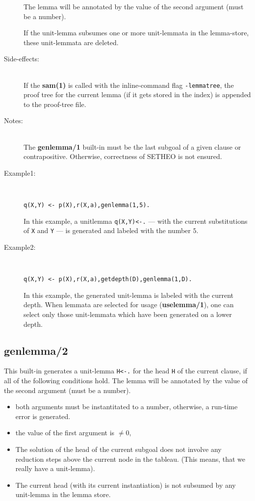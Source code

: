 \begin{description}
The lemma will be annotated by the value of the second argument
(must be a number).

If the unit-lemma subsumes one or more unit-lemmata in the lemma-store,
these unit-lemmata are deleted.

\item[Side-effects:]\ \\
If the {\bf sam(1)} is called with the inline-command flag {\tt -lemmatree},
the proof tree for the current lemma (if it gets stored in the index)
is appended to the proof-tree file.

\item[Notes:]\ \\
The {\bf genlemma/1} built-in must be the last subgoal of a given
clause or contrapositive.
Otherwise, correctness of SETHEO is not ensured.

\item[Example1:]\ \\
\begin{verbatim}
q(X,Y) <- p(X),r(X,a),genlemma(1,5).
\end{verbatim}

In this example, a unitlemma {\tt q(X,Y)<-.} --- with the current substitutions of {\tt X} and {\tt Y} --- is generated and labeled with the number $5$.

\item[Example2:]\ \\
\begin{verbatim}
q(X,Y) <- p(X),r(X,a),getdepth(D),genlemma(1,D).
\end{verbatim}

In this example, the generated unit-lemma is labeled with the current
depth. When lemmata are selected for usage ({\bf uselemma/1}), one
can select only those unit-lemmata which have been generated on a lower
depth.
\end{description}

\subsection{genlemma/2}

This built-in generates a unit-lemma {\tt H<-.} for the
head {\tt H} of the current clause, if all of the following
conditions hold.
The lemma will be annotated by the value of the second argument
(must be a number).

\begin{itemize}
\item
both arguments must be instantitated to a number,
otherwise, a run-time error is generated.
\item
the value of the first argument is $\neq 0$,
\item
The solution of the head of the current subgoal does not involve
any reduction steps above the current node in the tableau.
(This means, that we really have a unit-lemma).
\item
The current head (with its current instantiation) is not subsumed
by any unit-lemma in the lemma store.
\end{itemize}

